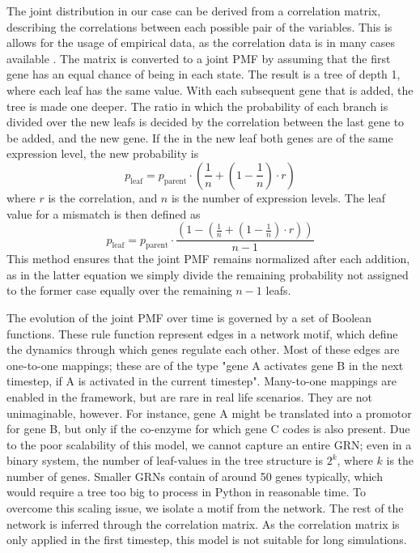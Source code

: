 \documentclass[../main.tex]{subfiles}
\begin{document}
The joint distribution in our case can be derived from a correlation matrix, describing the correlations between each possible pair of the variables.
This is allows for the usage of empirical data, as the correlation data is in many cases available \cite{}.
The matrix is converted to a joint PMF by assuming that the first gene has an equal chance of being in each state.
The result is a tree of depth 1, where each leaf has the same value.
With each subsequent gene that is added, the tree is made one deeper.
The ratio in which the probability of each branch is divided over the new leafs is decided by the correlation between the last gene to be added, and the new gene.
If the in the new leaf both genes are of the same expression level, the new probability is
%
\begin{equation}
    p_\mathrm{leaf} = p_\mathrm{parent} \cdot (\frac{1}{n} + (1 - \frac{1}{n}) \cdot r)
\end{equation}
%
where $r$ is the correlation, and $n$ is the number of expression levels.
The leaf value for a mismatch is then defined as
%
\begin{equation}
    p_\mathrm{leaf} = p_\mathrm{parent} \cdot \frac{(1 - (\frac{1}{n} + (1 - \frac{1}{n}) \cdot r))}{n-1} 
\end{equation}
%
This method ensures that the joint PMF remains normalized after each addition, as in the latter equation we simply divide the remaining probability not assigned to the former case equally over the remaining $n-1$ leafs.

The evolution of the joint PMF over time is governed by a set of Boolean functions.
These rule function represent edges in a network motif, which define the dynamics through which genes regulate each other.
Most of these edges are one-to-one mappings; these are of the type "gene A activates gene B in the next timestep, if A is activated in the current timestep".
Many-to-one mappings are enabled in the framework, but are rare in real life scenarios.
They are not unimaginable, however.
For instance, gene A might be translated into a promotor for gene B, but only if the co-enzyme for which gene C codes is also present.
Due to the poor scalability of this model, we cannot capture an entire GRN; even in a binary system, the number of leaf-values in the tree structure is $2^k$, where $k$ is the number of genes.
Smaller GRNs contain of around 50 genes typically, which would require a tree too big to process in Python in reasonable time.
To overcome this scaling issue, we isolate a motif from the network.
The rest of the network is inferred through the correlation matrix.
As the correlation matrix is only applied in the first timestep, this model is not suitable for long simulations.
\end{document}
